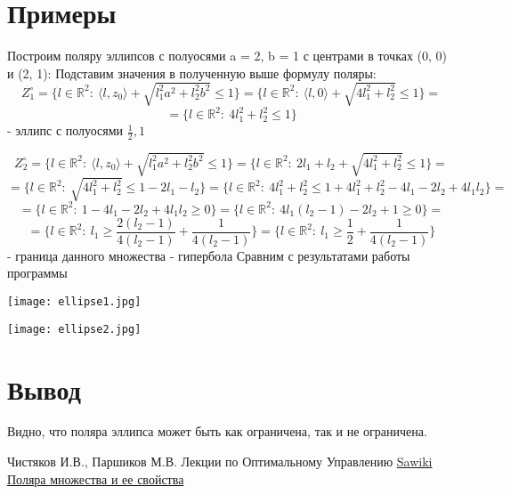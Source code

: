 \documentclass[11pt]{article}
\begin{document}
\section{Примеры}

Построим поляру эллипсов с полуосями a = 2, b = 1 с центрами в точках (0, 0) и (2, 1):
Подставим значения в полученную выше формулу поляры:
\[Z^{\circ}_1 = \{l \in \mathbb{R}^2:~ \langle l, z_0 \rangle + \sqrt{l_1^2 a^2 + l_2^2 b^2} \leq 1\} = \{l \in \mathbb{R}^2:~ \langle l, 0 \rangle + \sqrt{4 l_1^2 + l_2^2} \leq 1\} = \]
\[ = \{l \in \mathbb{R}^2:~ 4 l_1^2 + l_2^2 \leq 1\}\] - эллипс с полуосями $\frac{1}{2}, 1$

\[Z^{\circ}_2 = \{l \in \mathbb{R}^2:~ \langle l, z_0 \rangle + \sqrt{l_1^2 a^2 + l_2^2 b^2} \leq 1\} = \{l \in \mathbb{R}^2:~ 2 l_1 + l_2 + \sqrt{4 l_1^2 + l_2^2} \leq 1\} = \]
\[ = \{l \in \mathbb{R}^2:~ \sqrt{4 l_1^2 + l_2^2} \leq 1 - 2 l_1 - l_2\} = \{l \in \mathbb{R}^2:~ 4 l_1^2 + l_2^2 \leq 1 + 4 l_1^2 + l_2^2 - 4 l_1 - 2 l_2 + 4 l_1 l_2\} = \]
\[ = \{l \in \mathbb{R}^2:~ 1 - 4 l_1 - 2 l_2 + 4 l_1 l_2 \geq 0 \} = \{l \in \mathbb{R}^2:~ 4 l_1 (l_2 - 1) - 2 l_2 + 1 \geq 0 \} = \]
\[ = \{l \in \mathbb{R}^2:~ l_1 \geq \frac{2(l_2 - 1)}{4(l_2 - 1)} + \frac{1}{4(l_2 - 1)}\} = \{l \in \mathbb{R}^2:~ l_1 \geq \frac{1}{2} + \frac{1}{4(l_2 - 1)}\}\]
- граница данного множества - гипербола
\newline
Сравним с результатами работы программы

\texttt{[image: ellipse1.jpg]}

\texttt{[image: ellipse2.jpg]}

\section{Вывод}

Видно, что поляра эллипса может быть как ограничена, так и не ограничена.

\begin{thebibliography}{99}
 Чистяков И.В., Паршиков М.В. Лекции по Оптимальному Управлению
 \href{https://sawiki.cs.msu.ru/index.php/Поляра_множества_и_ее_свойства}{Sawiki Поляра множества и ее свойства}
\end{thebibliography}
\end{document}
